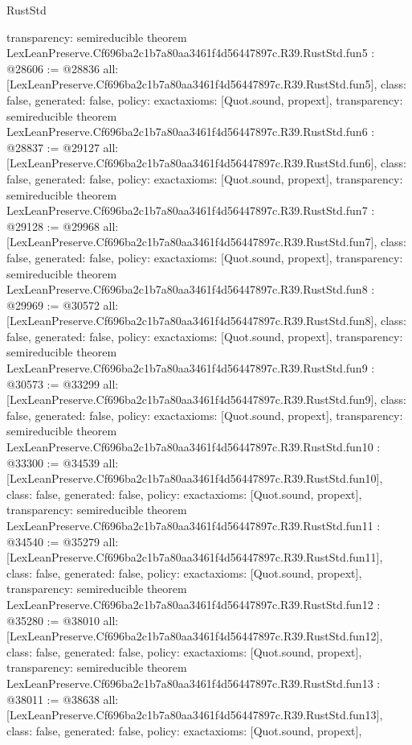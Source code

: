 \begin{lexlean}{RustStd}
\begin{coremodule}
{  transparency: semireducible
}
theorem LexLeanPreserve.Cf696ba2c1b7a80aa3461f4d56447897c.R39.RustStd.fun5 : @28606 := @28836 {
  all: [LexLeanPreserve.Cf696ba2c1b7a80aa3461f4d56447897c.R39.RustStd.fun5],
  class: false,
  generated: false,
  policy: exact{axioms: [Quot.sound, propext]},
  transparency: semireducible
}
theorem LexLeanPreserve.Cf696ba2c1b7a80aa3461f4d56447897c.R39.RustStd.fun6 : @28837 := @29127 {
  all: [LexLeanPreserve.Cf696ba2c1b7a80aa3461f4d56447897c.R39.RustStd.fun6],
  class: false,
  generated: false,
  policy: exact{axioms: [Quot.sound, propext]},
  transparency: semireducible
}
theorem LexLeanPreserve.Cf696ba2c1b7a80aa3461f4d56447897c.R39.RustStd.fun7 : @29128 := @29968 {
  all: [LexLeanPreserve.Cf696ba2c1b7a80aa3461f4d56447897c.R39.RustStd.fun7],
  class: false,
  generated: false,
  policy: exact{axioms: [Quot.sound, propext]},
  transparency: semireducible
}
theorem LexLeanPreserve.Cf696ba2c1b7a80aa3461f4d56447897c.R39.RustStd.fun8 : @29969 := @30572 {
  all: [LexLeanPreserve.Cf696ba2c1b7a80aa3461f4d56447897c.R39.RustStd.fun8],
  class: false,
  generated: false,
  policy: exact{axioms: [Quot.sound, propext]},
  transparency: semireducible
}
theorem LexLeanPreserve.Cf696ba2c1b7a80aa3461f4d56447897c.R39.RustStd.fun9 : @30573 := @33299 {
  all: [LexLeanPreserve.Cf696ba2c1b7a80aa3461f4d56447897c.R39.RustStd.fun9],
  class: false,
  generated: false,
  policy: exact{axioms: [Quot.sound, propext]},
  transparency: semireducible
}
theorem LexLeanPreserve.Cf696ba2c1b7a80aa3461f4d56447897c.R39.RustStd.fun10 : @33300 := @34539 {
  all: [LexLeanPreserve.Cf696ba2c1b7a80aa3461f4d56447897c.R39.RustStd.fun10],
  class: false,
  generated: false,
  policy: exact{axioms: [Quot.sound, propext]},
  transparency: semireducible
}
theorem LexLeanPreserve.Cf696ba2c1b7a80aa3461f4d56447897c.R39.RustStd.fun11 : @34540 := @35279 {
  all: [LexLeanPreserve.Cf696ba2c1b7a80aa3461f4d56447897c.R39.RustStd.fun11],
  class: false,
  generated: false,
  policy: exact{axioms: [Quot.sound, propext]},
  transparency: semireducible
}
theorem LexLeanPreserve.Cf696ba2c1b7a80aa3461f4d56447897c.R39.RustStd.fun12 : @35280 := @38010 {
  all: [LexLeanPreserve.Cf696ba2c1b7a80aa3461f4d56447897c.R39.RustStd.fun12],
  class: false,
  generated: false,
  policy: exact{axioms: [Quot.sound, propext]},
  transparency: semireducible
}
theorem LexLeanPreserve.Cf696ba2c1b7a80aa3461f4d56447897c.R39.RustStd.fun13 : @38011 := @38638 {
  all: [LexLeanPreserve.Cf696ba2c1b7a80aa3461f4d56447897c.R39.RustStd.fun13],
  class: false,
  generated: false,
  policy: exact{axioms: [Quot.sound, propext]},
}
\end{coremodule}
\end{lexlean}
